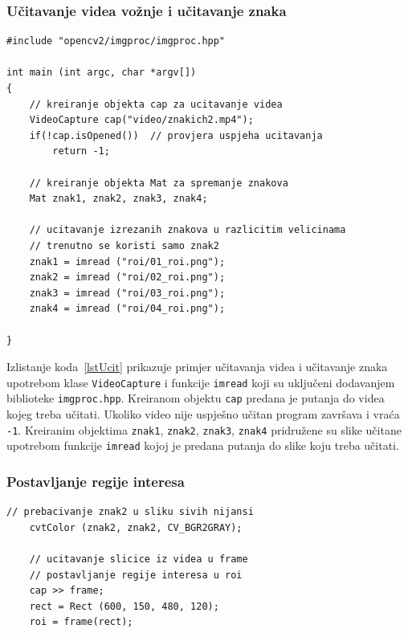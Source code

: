 \newpage
\subsubsection{Učitavanje videa vožnje i učitavanje znaka} %
\label{ssub:Učitavanje videa vožnje i učitavanje znaka}


\begin{lstlisting}[label=lstUcit,caption={Izvorni kod za učitavanje
videa i znaka}]
#include "opencv2/imgproc/imgproc.hpp"

int main (int argc, char *argv[])
{
    // kreiranje objekta cap za ucitavanje videa
    VideoCapture cap("video/znakich2.mp4");
    if(!cap.isOpened())  // provjera uspjeha ucitavanja
        return -1;

    // kreiranje objekta Mat za spremanje znakova
    Mat znak1, znak2, znak3, znak4;

    // ucitavanje izrezanih znakova u razlicitim velicinama
    // trenutno se koristi samo znak2 
    znak1 = imread ("roi/01_roi.png");      
    znak2 = imread ("roi/02_roi.png");
    znak3 = imread ("roi/03_roi.png");
    znak4 = imread ("roi/04_roi.png");

}
\end{lstlisting}

Izlistanje koda~\ref{lstUcit} prikazuje primjer učitavanja videa i
učitavanje znaka upotrebom klase \texttt{VideoCapture} i funkcije
\texttt{imread} koji su uključeni dodavanjem biblioteke
\texttt{imgproc.hpp}. Kreiranom objektu \texttt{cap} predana je putanja
do videa kojeg treba učitati. Ukoliko video nije uspješno učitan program
završava i vraća \texttt{-1}. Kreiranim objektima \texttt{znak1},
\texttt{znak2}, \texttt{znak3}, \texttt{znak4} pridružene su slike
učitane upotrebom funkcije \texttt{imread} kojoj je predana putanja do
slike koju treba učitati.


\newpage
\subsubsection{Postavljanje regije interesa} %
\label{ssub:Postavljanje regije interesa}


\begin{lstlisting}[label=lstRoi,caption={Izvorni kod za postvljanje
regije interesa}]
    // prebacivanje znak2 u sliku sivih nijansi
    cvtColor (znak2, znak2, CV_BGR2GRAY);
    
    // ucitavanje slicice iz videa u frame
    // postavljanje regije interesa u roi
    cap >> frame;
    rect = Rect (600, 150, 480, 120);
    roi = frame(rect);
    
\end{lstlisting}

